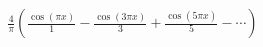 \documentclass[preview]{standalone}
\begin{document}
\begin{align*}
\frac{4}{\pi} \left( \frac{\cos(\pi x)}{1} -\frac{\cos(3\pi x)}{3} +\frac{\cos(5\pi x)}{5} - \cdots \right)
\end{align*}
\end{document}
